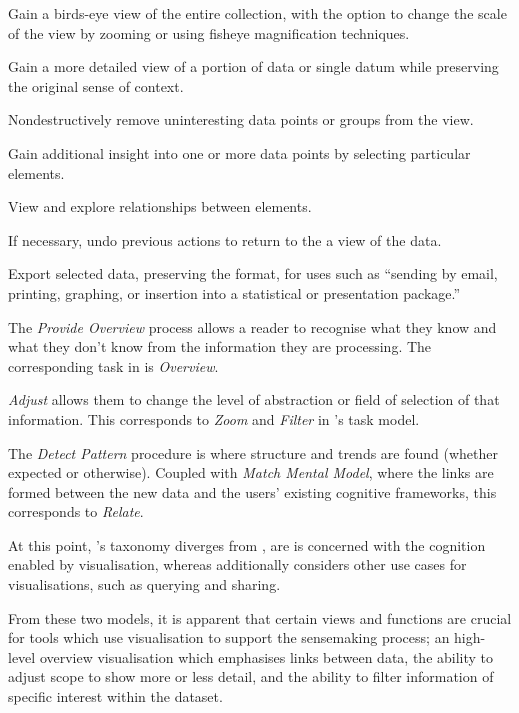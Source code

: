 \begin{description}[leftmargin=11em,style=nextline]
	\item [Overview] Gain a birds-eye view of the entire collection, with the option to change the scale of the view by zooming or using fisheye magnification techniques.
	\item[Zoom] Gain a more detailed view of a portion of data or single datum while preserving the original sense of context.
	\item[Filter] Nondestructively remove uninteresting data points or groups from the view.
	\item[Details-on-Demand] Gain additional insight into one or more data points by selecting particular elements.
	\item[Relate] View and explore relationships between elements.
	\item[History] If necessary, undo previous actions to return to the a view of the data.
	\item[Extract] Export selected data, preserving the format, for uses such as ``sending by email, printing, graphing, or insertion into a statistical or presentation package.'' \citep[p.5]{TheEyesHaveIt}
\end{description}

The \textit{Provide Overview} process allows a reader to recognise what they know and what they don't know from the information they are processing. The corresponding task in \citep{TheEyesHaveIt} is \textit{Overview}.

\textit{Adjust} allows them to change the level of abstraction or field of selection of that information. This corresponds to \textit{Zoom} and \textit{Filter} in \citeauthor{TheEyesHaveIt}'s task model.

The \textit{Detect Pattern} procedure is where structure and trends are found (whether expected or otherwise). Coupled with \textit{Match Mental Model}, where the links are formed between the new data and the users' existing cognitive frameworks, this corresponds to \textit{Relate}.

At this point, \citeauthor{TheEyesHaveIt}'s taxonomy diverges from \citeauthor{UnderstandingAndCharacterizingInsights}, are \citeauthor{UnderstandingAndCharacterizingInsights} is concerned with the cognition enabled by visualisation, whereas  \citeauthor{TheEyesHaveIt} additionally considers other use cases for visualisations, such as querying and sharing.

From these two models, it is apparent that certain views and functions are crucial for tools which use visualisation to support the sensemaking process; an high-level overview visualisation which emphasises links between data, the ability to adjust scope to show more or less detail, and the ability to filter information of specific interest within the dataset.



